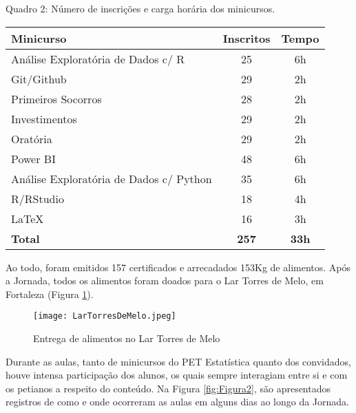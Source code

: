 \documentclass{sciposter}
\begin{document}
\begin{multicols}{2}
{\begin{center}
    Quadro 2: Número de inscrições e carga horária dos minicursos.\vspace{0.5cm}
    \begin{table}[H]
    \centering
        \begin{tabular}{|l|c|c|}
        \hline
        \textbf{Minicurso} & \textbf{Inscritos} & \textbf{Tempo} \\ \hline
        Análise Exploratória de Dados c/ R & 25 & 6h \\
        \hline
        Git/Github & 29 & 2h \\ 
        \hline
        Primeiros Socorros & 28 & 2h \\
        \hline
        Investimentos & 29 & 2h \\
        \hline
        Oratória & 29 & 2h \\
        \hline
        Power BI & 48 & 6h \\
        \hline
        Análise Exploratória de Dados c/ Python & 35 & 6h \\
        \hline
        R/RStudio & 18 & 4h \\
        \hline
        LaTeX & 16 & 3h \\
        \hline
        \textbf{Total} & \textbf{257} & \textbf{33h} \\
        \hline
       \end{tabular}
       \label{frequencia}
    \end{table}
\end{center}

Ao todo, foram emitidos 157 certificados e arrecadados 153Kg de alimentos. Após a Jornada, todos os alimentos foram doados para o Lar Torres de Melo, em Fortaleza (Figura \ref{fig:Figura1}).

\begin{figure}[H] \normalsize
\begin{center}
\texttt{[image: LarTorresDeMelo.jpeg]}
\caption{Entrega de alimentos no Lar Torres de Melo}
\label{fig:Figura1}
\end{center}
\end{figure}
\vspace{-1cm}

Durante as aulas, tanto de minicursos do PET Estatística quanto dos convidados, houve intensa participação dos alunos, os quais sempre interagiam entre si e com os petianos a respeito do conteúdo. Na Figura \ref{fig:Figura2}, são apresentados registros de como e onde ocorreram as aulas em alguns dias ao longo da Jornada.

}
\end{multicols}
\end{document}
